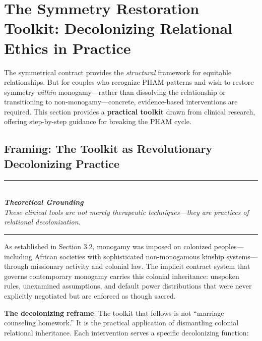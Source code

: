 \documentclass[12pt,openany]{book}
\numberwithin{equation}{chapter}
\begin{document}
\section{The Symmetry Restoration Toolkit: Decolonizing Relational Ethics in Practice}

The symmetrical contract provides the \textit{structural} framework for equitable relationships. But for couples who recognize PHAM patterns and wish to restore symmetry \textit{within} monogamy---rather than dissolving the relationship or transitioning to non-monogamy---concrete, evidence-based interventions are required. This section provides a \textbf{practical toolkit} drawn from clinical research, offering step-by-step guidance for breaking the PHAM cycle.

\subsection{Framing: The Toolkit as Revolutionary Decolonizing Practice}

\begin{center}
\rule{0.6\textwidth}{0.4pt}\\[0.5em]
\textit{\textbf{Theoretical Grounding}}\\[0.3em]
\textit{These clinical tools are not merely therapeutic techniques---they are practices of relational decolonization.}\\[0.5em]
\rule{0.6\textwidth}{0.4pt}
\end{center}

As established in Section 3.2, monogamy was imposed on colonized peoples---including African societies with sophisticated non-monogamous kinship systems---through missionary activity and colonial law. The implicit contract system that governs contemporary monogamy carries this colonial inheritance: unspoken rules, unexamined assumptions, and default power distributions that were never explicitly negotiated but are enforced as though sacred.

\textbf{The decolonizing reframe}: The toolkit that follows is not ``marriage counseling homework.'' It is the practical application of dismantling colonial relational inheritance. Each intervention serves a specific decolonizing function:
\end{document}
